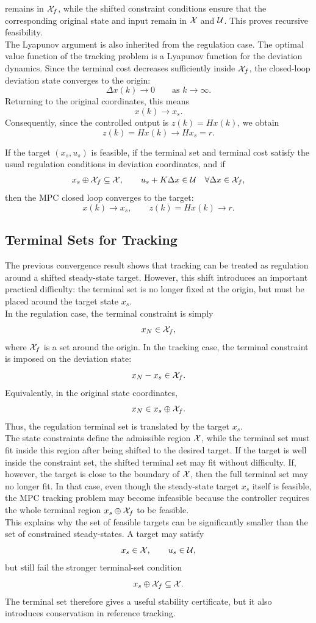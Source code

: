 remains in \(\mathcal{X}_f\), while the shifted constraint conditions ensure that the corresponding
original state and input remain in \(\mathcal{X}\) and \(\mathcal{U}\). This proves recursive feasibility.\\
The Lyapunov argument is also inherited from the regulation case. The optimal value function
of the tracking problem is a Lyapunov function for the deviation dynamics. Since the terminal
cost decreases sufficiently inside \(\mathcal{X}_f\), the closed-loop deviation state converges to the
origin:
\[
    \Delta x(k)\to 0
    \qquad \text{as } k\to\infty.
\]
Returning to the original coordinates, this means
\[
    x(k)\to x_s.
\]
Consequently, since the controlled output is \(z(k)=Hx(k)\), we obtain
\[
    z(k)=Hx(k)\to Hx_s=r.
\]

\begin{theorembox}
If the target \((x_s,u_s)\) is feasible, if the terminal set and terminal cost satisfy the usual
regulation conditions in deviation coordinates, and if
\[
    x_s\oplus\mathcal{X}_f\subseteq\mathcal{X},
    \qquad
    u_s+K\Delta x\in\mathcal{U} \quad \forall \Delta x\in\mathcal{X}_f,
\]
then the MPC closed loop converges to the target:
\[
    x(k)\to x_s,\qquad z(k)=Hx(k)\to r.
\]
\end{theorembox}

\subsection{Terminal Sets for Tracking}

The previous convergence result shows that tracking can be treated as regulation around a
shifted steady-state target. However, this shift introduces an important practical difficulty:
the terminal set is no longer fixed at the origin, but must be placed around the target state
\(x_s\).\\
In the regulation case, the terminal constraint is simply
\[
    x_N\in\mathcal{X}_f,
\]
where \(\mathcal{X}_f\) is a set around the origin. In the tracking case, the terminal constraint is imposed
on the deviation state:
\[
    x_N-x_s\in\mathcal{X}_f.
\]
Equivalently, in the original state coordinates,
\[
    x_N\in x_s\oplus\mathcal{X}_f.
\]
Thus, the regulation terminal set is translated by the target \(x_s\).\\
The state constraints define the
admissible region \(\mathcal{X}\), while the terminal set must fit inside this region after being shifted
to the desired target. If the target is well inside the constraint set, the shifted terminal set may
fit without difficulty. If, however, the target is close to the boundary of \(\mathcal{X}\), then the full
terminal set may no longer fit. In that case, even though the steady-state target \(x_s\) itself is
feasible, the MPC tracking problem may become infeasible because the controller requires the
whole terminal region \(x_s\oplus\mathcal{X}_f\) to be feasible.\\
This explains why the set of feasible targets can be significantly smaller than the set of
constrained steady-states. A target may satisfy
\[
    x_s\in\mathcal{X},\qquad u_s\in\mathcal{U},
\]
but still fail the stronger terminal-set condition
\[
    x_s\oplus\mathcal{X}_f\subseteq\mathcal{X}.
\]
The terminal set therefore gives a useful stability certificate, but it also introduces conservatism
in reference tracking.

